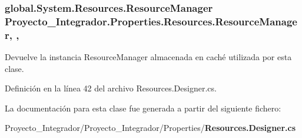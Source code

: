 \subsubsection[{Resource\-Manager}]{\setlength{\rightskip}{0pt plus 5cm}global.\-System.\-Resources.\-Resource\-Manager Proyecto\-\_\-\-Integrador.\-Properties.\-Resources.\-Resource\-Manager\hspace{0.3cm}{\ttfamily [static]}, {\ttfamily [get]}, {\ttfamily [package]}}\label{class_proyecto___integrador_1_1_properties_1_1_resources_a237e8065ad5f4f7bf1c6e80d06616e6d}


Devuelve la instancia Resource\-Manager almacenada en caché utilizada por esta clase. 



Definición en la línea 42 del archivo Resources.\-Designer.\-cs.



La documentación para esta clase fue generada a partir del siguiente fichero\-:\begin{DoxyCompactItemize}
\item 
Proyecto\-\_\-\-Integrador/\-Proyecto\-\_\-\-Integrador/\-Properties/{\bf Resources.\-Designer.\-cs}\end{DoxyCompactItemize}
